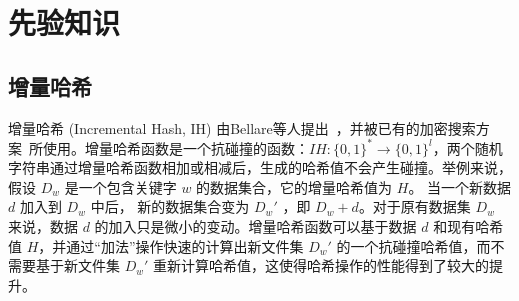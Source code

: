 


\section{先验知识}

\subsection{增量哈希}
增量哈希 (Incremental Hash, IH) 由Bellare等人提出~\cite{bellare1994incremental}，并被已有的加密搜索方案~\cite{kamara2011cs2}所使用。增量哈希函数是一个抗碰撞的函数：$IH: \{0,1\}^* \rightarrow \{0,1\}^l$，两个随机字符串通过增量哈希函数相加或相减后，生成的哈希值不会产生碰撞。举例来说，假设 $D_w$ 是一个包含关键字 $w$ 的数据集合，它的增量哈希值为 $H$。 当一个新数据 $d$ 加入到 $D_w$ 中后， 新的数据集合变为 $D_w'$ ，即 $D_w+d$。对于原有数据集 $D_w$ 来说，数据 $d$ 的加入只是微小的变动。增量哈希函数可以基于数据 $d$ 和现有哈希值 $H$，并通过“加法”操作快速的计算出新文件集 $D_w'$ 的一个抗碰撞哈希值，而不需要基于新文件集 $D_w'$ 重新计算哈希值，这使得哈希操作的性能得到了较大的提升。


